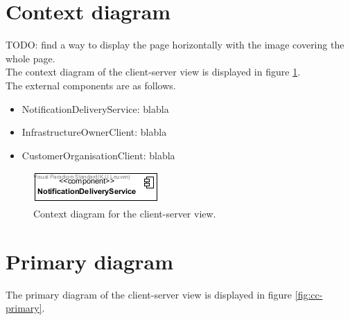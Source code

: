 
\showcsnotes{}

\section{Context diagram}
    TODO: find a way to display the page horizontally with the image covering the whole page. \\

    The context diagram of the client-server view is displayed in figure \ref{fig:cc-context}. \\

    The external components are as follows.
    \begin{itemize}
        \item NotificationDeliveryService: blabla
        \item InfrastructureOwnerClient: blabla
        \item CustomerOrganisationClient: blabla
    \end{itemize}


    \begin{figure}[!htp]
    	\centering
    	\includegraphics[width=\textwidth]{images/component-context}
    	\caption{Context diagram for the client-server view.}\label{fig:cc-context}
    \end{figure}

\section{Primary diagram}
    The primary diagram of the client-server view is displayed in figure \ref{fig:cc-primary}. \\

